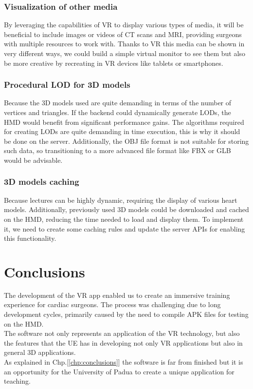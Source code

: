 \subsection{Visualization of other media}
\noindent
By leveraging the capabilities of \ac{VR} to display various types of media, it will be beneficial to include images or videos of \ac{CT} scans and \ac{MRI}, providing surgeons with multiple resources to work with.
Thanks to \ac{VR} this media can be shown in very different ways, we could build a simple virtual monitor to see them but also be more creative by recreating in \ac{VR} devices like tablets or smartphones.

\subsection{Procedural \ac{LOD} for 3D models}
\noindent
Because the 3D models used are quite demanding in terms of the number of vertices and triangles. If the backend could dynamically generate \ac{LOD}s, the \ac{HMD} would benefit from significant performance gains.
The algorithms required for creating \ac{LOD}s are quite demanding in time execution, this is why it should be done on the server.
Additionally, the OBJ file format is not suitable for storing such data, so transitioning to a more advanced file format like FBX or GLB would be advisable.

\subsection{3D models caching}
\noindent
Because lectures can be highly dynamic, requiring the display of various heart models. Additionally, previously used 3D models could be downloaded and cached on the \ac{HMD}, reducing the time needed to load and display them.
To implement it, we need to create some caching rules and update the server \ac{API}s for enabling this functionality.

\chapter{Conclusions}
\noindent
The development of the \ac{VR} app enabled us to create an immersive training experience for cardiac surgeons.
The process was challenging due to long development cycles, primarily caused by the need to compile \ac{APK} files for testing on the \ac{HMD}.\\
The software not only represents an application of the \ac{VR} technology, but also the features  that the \ac{UE} has in developing not only \ac{VR} applications but also in general 3D applications.\\
As explained in Chp.[\ref{chp:conclusions}] the software is far from finished but it is an opportunity for the University of Padua to create a unique application for teaching.\\